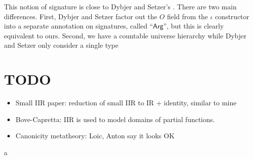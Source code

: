 \documentclass[acmsmall,screen,review,anonymous]{acmart}
\newcommand{\msf}[1]{{\mathsf{#1}}}
\begin{document}
This notion of signature is close to Dybjer and Setzer's \cite{TODO}. There are two main differences.
First, Dybjer and Setzer factor out the $O$ field from the $\iota$ constructor into a separate annotation
on signatures, called ``$\msf{Arg}$'', but this is clearly equivalent to ours. Second, we have a countable
universe hierarchy while Dybjer and Setzer only consider a single type








\section{TODO}

\begin{itemize}
  \item Small IIR paper: reduction of small IIR to IR + identity, similar to mine
  \item Bove-Capretta: IIR is used to model domains of partial functions.
  \item Canonicity metatheory: Loic, Anton say it looks OK
\end{itemize}a











\end{document}
